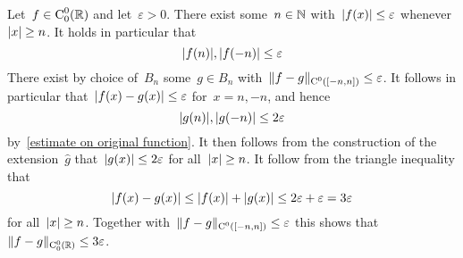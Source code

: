 Let~$f \in \operatorname{C}_0^0(\mathbb{R})$ and let~$\varepsilon > 0$.
There exist some~$n \in \mathbb{N}$ with~$\lvert f(x)\rvert \leq \varepsilon$ whenever~$\lvert x\rvert \geq n$.
It holds in particular that
\begin{equation}
  \label{estimate on original function}
        {\lvert f(n)\rvert}, {\lvert f(-n)\rvert}
  \leq  \varepsilon
\end{equation}
There exist by choice of~$B_n$ some~$g \in B_n$ with~$\lVert f-g\rVert_{\operatorname{C}^0([-n,n])} \leq \varepsilon$.
It follows in particular that~$\lvert f(x) - g(x)\rvert \leq \varepsilon$ for~$x = n, -n$, and hence
\[
        \lvert g(n)\rvert, \lvert g(-n)\rvert
  \leq  2 \varepsilon
\]
by~\eqref{estimate on original function}.
It then follows from the construction of the extension~$\hat{g}$ that~$\lvert g(x)\rvert \leq 2\varepsilon$ for all~$\lvert x\rvert \geq n$.
It follow from the triangle inequality that
\[
        \lvert f(x) - g(x)\rvert
  \leq  \lvert f(x)\rvert + \lvert g(x)\rvert
  \leq  2 \varepsilon + \varepsilon
  =     3 \varepsilon
\]
for all~$\lvert x\rvert \geq n$.
Together with~$\lVert f-g\rVert_{\operatorname{C}^0([-n,n])} \leq \varepsilon$ this shows that~$\lVert f-g\rVert_{\operatorname{C}^0_0(\mathbb{R})} \leq 3 \varepsilon$.




